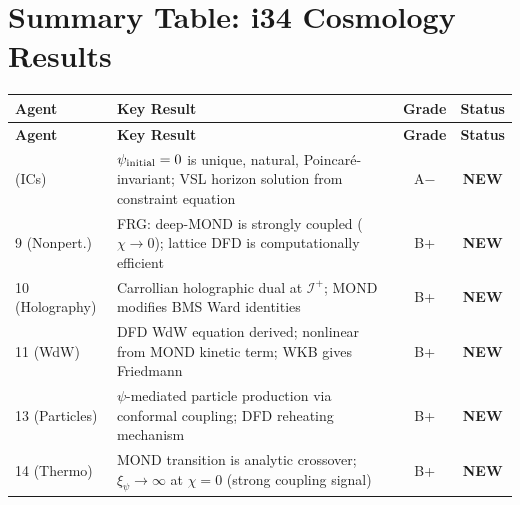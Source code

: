 \documentclass[11pt,a4paper]{article}
\newcommand{\NEW}{\textcolor{dfdblue}{\textbf{NEW}}}
\begin{document}
\newpage

\section{Summary Table: i34 Cosmology Results}
\label{sec:cosmo-summary}

\begin{center}
\begin{longtable}{lp{6cm}cc}
\toprule
\textbf{Agent} & \textbf{Key Result} & \textbf{Grade} & \textbf{Status} \\
\midrule
\endfirsthead
\midrule
\textbf{Agent} & \textbf{Key Result} & \textbf{Grade} & \textbf{Status} \\
\midrule
\endhead
\bottomrule
\endlastfoot
8 (ICs) & $\psi_{\rm initial} = 0$ is unique, natural, Poincar\'e-invariant; VSL horizon solution from constraint equation & A$-$ & \NEW \\
9 (Nonpert.) & FRG: deep-MOND is strongly coupled ($\chi \to 0$); lattice DFD is computationally efficient & B+ & \NEW \\
10 (Holography) & Carrollian holographic dual at $\mathscr{I}^+$; MOND modifies BMS Ward identities & B+ & \NEW \\
11 (WdW) & DFD WdW equation derived; nonlinear from MOND kinetic term; WKB gives Friedmann & B+ & \NEW \\
13 (Particles) & $\psi$-mediated particle production via conformal coupling; DFD reheating mechanism & B+ & \NEW \\
14 (Thermo) & MOND transition is analytic crossover; $\xi_\psi \to \infty$ at $\chi = 0$ (strong coupling signal) & B+ & \NEW \\
\end{longtable}
\end{center}
\end{document}
